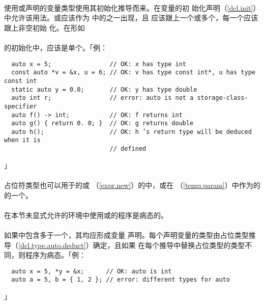 \paragraph{}
使用或声明的变量类型使用其初始化推导而来。在变量的初
始化声明（\ref{dcl.init}）中允许该用法。或应该作为
中的之一出现，且
应该跟上一个或多个，每一个应该跟上非空初始
化。在形如                                                                    \\
\mbox{\qquad \tm{(}  \tm{)}}                              \\
的初始化中，应该是单个。「例：
\begin{lstlisting}
  auto x = 5;                // OK: x has type int
  const auto *v = &x, u = 6; // OK: v has type const int*, u has type const int
  static auto y = 0.0;       // OK: y has type double
  auto int r;                // error: auto is not a storage-class-specifier
  auto f() -> int;           // OK: f returns int
  auto g() { return 0. 0; }  // OK: g returns double
  auto h();                  // OK: h ’s return type will be deduced when it is
                             // defined
\end{lstlisting}」

\paragraph{}
占位符类型也可以用于的或
（\ref{expr.new}）的中，或在
（\ref{temp.param}）中作为的
的一个。

\paragraph{}
在本节未显式允许的环境中使用或的程序是病态的。

\paragraph{}
如果中包含多于一个，其均应形成变量
声明。每个声明变量的类型由占位类型推导（\ref{dcl.type.auto.deduct}）确定，且如果
在每个推导中替换占位类型的类型不同，则程序为病态。「例：
\begin{lstlisting}
  auto x = 5, *y = &x;      // OK: auto is int
  auto a = 5, b = { 1, 2 }; // error: different types for auto
\end{lstlisting}」


